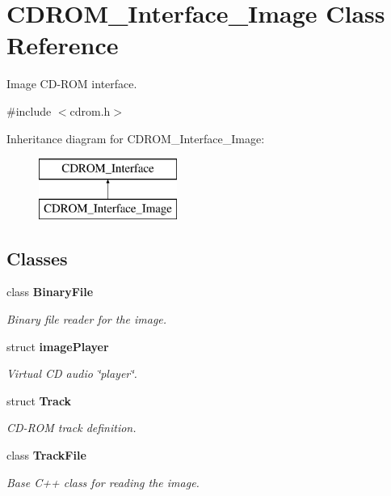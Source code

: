 \hypertarget{classCDROM__Interface__Image}{\section{C\-D\-R\-O\-M\-\_\-\-Interface\-\_\-\-Image Class Reference}
\label{classCDROM__Interface__Image}
}


Image C\-D-\/\-R\-O\-M interface.  




{\ttfamily \#include $<$cdrom.\-h$>$}

Inheritance diagram for C\-D\-R\-O\-M\-\_\-\-Interface\-\_\-\-Image\-:\begin{figure}[H]
\begin{center}
\leavevmode
\includegraphics[height=2.000000cm]{classCDROM__Interface__Image}
\end{center}
\end{figure}
\subsection*{Classes}
\begin{DoxyCompactItemize}
\item 
class {\bfseries Binary\-File}
\begin{DoxyCompactList}\small\item\em Binary file reader for the image. \end{DoxyCompactList}\item 
struct {\bfseries image\-Player}
\begin{DoxyCompactList}\small\item\em Virtual C\-D audio \char`\"{}player\char`\"{}. \end{DoxyCompactList}\item 
struct {\bfseries Track}
\begin{DoxyCompactList}\small\item\em C\-D-\/\-R\-O\-M track definition. \end{DoxyCompactList}\item 
class {\bfseries Track\-File}
\begin{DoxyCompactList}\small\item\em Base C++ class for reading the image. \end{DoxyCompactList}\end{DoxyCompactItemize}

